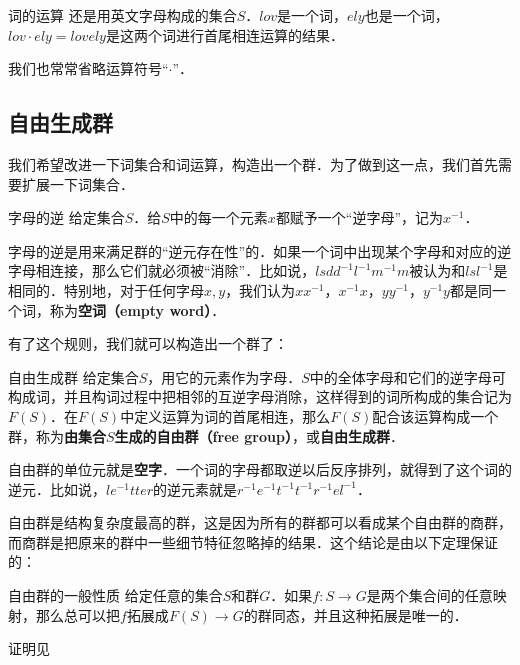 \begin{example}{词的运算}
还是用英文字母构成的集合$S$．$lov$是一个词，$ely$也是一个词，$lov\cdot ely=lovely$是这两个词进行首尾相连运算的结果．
\end{example}

我们也常常省略运算符号“$\cdot$”．

\subsection{自由生成群}

我们希望改进一下词集合和词运算，构造出一个群．为了做到这一点，我们首先需要扩展一下词集合．

\begin{definition}{字母的逆}
给定集合$S$．给$S$中的每一个元素$x$都赋予一个“逆字母”，记为$x^{-1}$．
\end{definition}

字母的逆是用来满足群的“逆元存在性”的．如果一个词中出现某个字母和对应的逆字母相连接，那么它们就必须被“消除”．比如说，$lsdd^{-1}l^{-1}m^{-1}m$被认为和$lsl^{-1}$是相同的．特别地，对于任何字母$x, y$，我们认为$xx^{-1}$，$x^{-1}x$，$yy^{-1}$，$y^{-1}y$都是同一个词，称为\textbf{空词（empty word）}．

有了这个规则，我们就可以构造出一个群了：

\begin{theorem}{自由生成群}
给定集合$S$，用它的元素作为字母．$S$中的全体字母和它们的逆字母可构成词，并且构词过程中把相邻的互逆字母消除，这样得到的词所构成的集合记为$F(S)$．在$F(S)$中定义运算为词的首尾相连，那么$F(S)$配合该运算构成一个群，称为\textbf{由集合$S$生成的自由群（free group）}，或\textbf{自由生成群}．
\end{theorem}

自由群的单位元就是\textbf{空字}．一个词的字母都取逆以后反序排列，就得到了这个词的逆元．比如说，$le^{-1}tter$的逆元素就是$r^{-1}e^{-1}t^{-1}t^{-1}r^{-1}el^{-1}$．

自由群是结构复杂度最高的群，这是因为所有的群都可以看成某个自由群的商群，而商群是把原来的群中一些细节特征忽略掉的结果．这个结论是由以下定理保证的：

\begin{theorem}{自由群的一般性质}\label{FreGrp_the1}
给定任意的集合$S$和群$G$．如果$f:S\rightarrow G$是两个集合间的任意映射，那么总可以把$f$拓展成$F(S)\rightarrow G$的群同态，并且这种拓展是唯一的．
\end{theorem}

证明见
